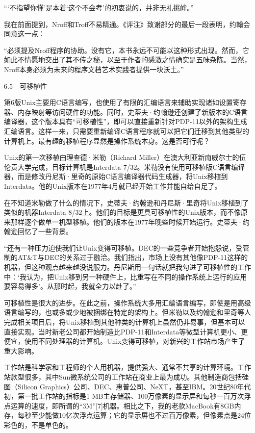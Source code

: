 \documentclass[a4paper,12pt,UTF8,twoside]{ctexbook}
\begin{document}
“‘不指望你懂’是本着‘这个不会考’的初衷说的，并非无礼挑衅。”



我在前面提到，Nroff和Troff不易精通。《评注》致谢部分的最后一段表明，约翰会同意这一点：

“必须提及Nroff程序的协助。没有它，本书永远不可能以这种形式出现。然而，它如此不情愿地交出了其不传之秘，以至于作者的感激之情确实是五味杂陈。当然，Nroff本身必须为未来的程序文档艺术实践者提供一块沃土。”





6.5　可移植性


第6版Unix主要用C语言编写，也使用了有限的汇编语言来辅助实现诸如设置寄存器、内存映射等访问硬件的功能。同时，史蒂夫·约翰逊还创建了新版本的C语言编译器，这个版本具有“可移植性”，即可以直接重新针对PDP-11以外的架构生成汇编语言。这样一来，只需要重新编译C语言程序就可以把它们迁移到其他类型的计算机上。最有趣的移植程序显然是操作系统本身。这是否可行呢？

Unix的第一次移植由理查德·米勒（Richard Miller）在澳大利亚新南威尔士的伍伦贡大学完成，目标计算机是Interdata 7/32。米勒没有使用可移植版C语言编译器，而是修改丹尼斯·里奇的原始C语言编译器代码生成器，将Unix移植到Interdata。他的Unix版本在1977年4月就已经开始工作并能自给自足了。

在不知道米勒做了什么的情况下，史蒂夫·约翰逊和丹尼斯·里奇将Unix移植到了类似的机器Interdata 8/32上。他们的目标是更具可移植性的Unix版本，而不像原来那样逐个做单一机型移植。他们的版本在1977年晚些时候开始运行。史蒂夫·约翰逊回忆了一些背景。

“还有一种压力迫使我们让Unix变得可移植。DEC的一些竞争者开始抱怨说，受管制的AT\&T与DEC的关系过于融洽。我们指出，市场上没有其他像PDP-11这样的机器，但这种观点越来越没说服力。丹尼斯用一句话就把我勾进了可移植性的工作中：‘我认为，把Unix移到另一种硬件上，比重写在不同的操作系统上运行的应用要容易得多’。从那时起，我就全力以赴了。”



可移植性是很大的进步。在此之前，操作系统大多用汇编语言编写，即使是用高级语言编写的，也或多或少地被捆绑在特定的架构上。但米勒以及约翰逊和里奇等人完成相关项目后，将Unix移植到其他种类的计算机上虽然仍非易事，但基本可以直接实现。当时新老公司都开始制造比PDP-11和Interdata等微型计算机更小、更便宜，使用不同处理器的计算机。Unix变得可移植，对新兴的工作站市场产生了重大影响。

工作站是科学家和工程师的个人用机器，提供强大、通常不共享的计算环境。工作站款型很多，其中Sun微系统公司的工作站在商业上最为成功。其他制造商包括硅图（Silicon Graphics）公司、DEC、惠普公司、NeXT，甚至IBM。20世纪80年代初，第一批工作站的指标是1 MB主存储器、100万像素的显示屏和每秒一百万次浮点运算的速度，即所谓的“3M”[7]机器。相比之下，我的老款MacBook有8GB内存，每秒至少能做10亿次浮点运算；它的显示屏也不过百万像素，但像素点是24位彩色的，不是单色的。
\end{document}
